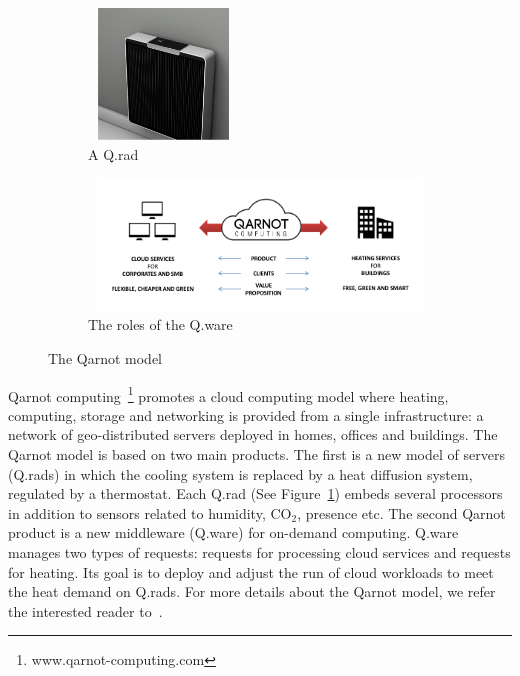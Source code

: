 \documentclass[10pt, conference, compsocconf]{IEEEtran}
\begin{document}
	\begin{figure}[htbp]
          \begin{subfigure}[b]{0.4\textwidth}
            \centering
            \includegraphics[width=4cm,height=3.5cm]{./Figures/rad.png}
            \caption{\scriptsize A Q.rad }
          \end{subfigure}
          \begin{subfigure}[b]{0.4\textwidth}
            \centering
            \includegraphics[width=10.7cm,height=3.5cm]{./Figures/model.png}
            \caption{\scriptsize The roles of the Q.ware }
          \end{subfigure}
	\caption{The Qarnot model}
	\label{fig:digital}
	\end{figure}


Qarnot computing~\footnote{www.qarnot-computing.com} promotes a cloud computing model where heating, computing, 
storage and networking is provided from a single infrastructure: a network of geo-distributed servers deployed in homes, offices and buildings. 
The Qarnot model is based on two main products. The first is a new model of servers (Q.rads) in which the cooling system is replaced by a 
heat diffusion system, regulated by a thermostat. Each Q.rad (See Figure~\ref{fig:digital}) embeds several processors in addition to sensors 
related to humidity, $\mathrm{CO_2}$, presence etc. The second Qarnot product is a new middleware (Q.ware) for on-demand computing. Q.ware manages 
two types of requests: requests for processing cloud services and requests for heating. Its goal is to deploy and 
adjust the run of cloud workloads to meet the heat demand on Q.rads. For more details about the Qarnot model, we refer the interested 
reader to~\cite{DBLP:conf/europar/Ngoko16}.
\end{document}
